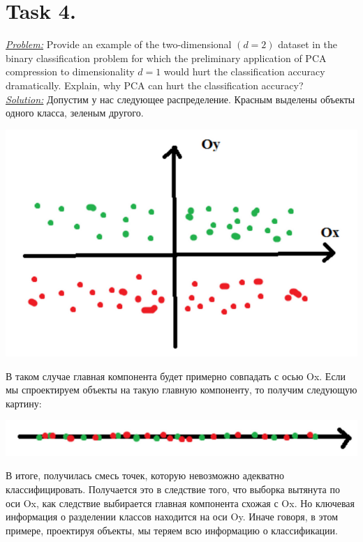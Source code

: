 \documentclass[a4paper,12pt]{article}
\begin{document}
\section*{Task 4.}
\underline{\textit{Problem:}} Provide an example of the two-dimensional \((d =
2)\) dataset in the binary classification problem for which the preliminary
application of PCA compression to dimensionality \(d = 1\) would hurt the
classification accuracy dramatically. Explain, why PCA can hurt the
classification accuracy?\\
\newline
\underline{\textit{Solution:}} Допустим у нас следующее распределение. Красным выделены объекты одного класса, зеленым
другого.
\begin{center}
    \includegraphics[width=0.8\linewidth]{1.png}
\end{center}
В таком случае главная компонента будет примерно совпадать с осью Ox. Если мы
спроектируем объекты на такую главную компоненту, то получим следующую картину:
\begin{center}
    \includegraphics[width=0.8\linewidth]{2.png}
\end{center}
В итоге, получилась смесь точек, которую невозможно адекватно классифицировать.
Получается это в следствие того, что выборка вытянута по оси Ox, как следствие
выбирается главная компонента схожая с Ox. Но ключевая информация о разделении
классов находится на
оси Oy. Иначе говоря, в этом примере, проектируя объекты, мы теряем всю
информацию о классификации.
\end{document}
